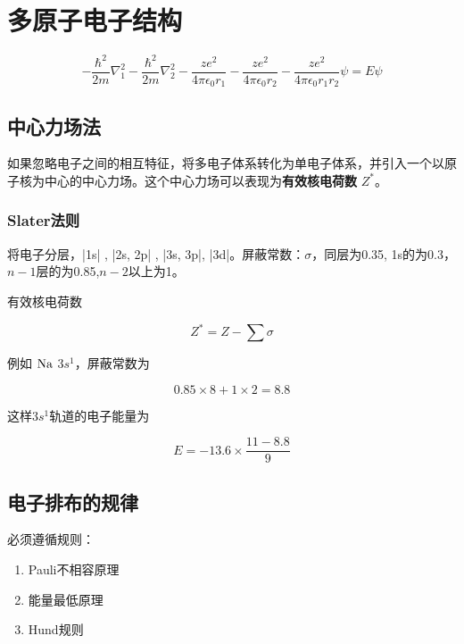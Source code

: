 \chapter{多原子电子结构}

\begin{equation*}
	-\frac{\hbar^2}{2m} \nabla_1^2 - \frac{\hbar^2}{2m} \nabla_2^2 - \frac{ze^2}{4\pi\epsilon_0r_1} - \frac{ze^2}{4\pi\epsilon_0r_2} - \frac{ze^2}{4\pi\epsilon_0r_1r_2} \psi = E\psi
\end{equation*}

\section{中心力场法}

如果忽略电子之间的相互特征，将多电子体系转化为单电子体系，并引入一个以原子核为中心的中心力场。这个中心力场可以表现为\textbf{有效核电荷数} $Z^*$。

\subsection{Slater法则}

将电子分层，|1s| , |2s, 2p| , |3s, 3p|, |3d|。屏蔽常数：$\sigma$，同层为0.35, 1s的为0.3，$n - 1$层的为0.85,$n - 2$以上为1。

有效核电荷数

\begin{equation*}
	Z^* = Z - \sum \sigma
\end{equation*}

例如 $\ce{Na}$ $3s^1$，屏蔽常数为

\begin{equation*}
	0.85 \times 8 + 1 \times 2 = 8.8
\end{equation*}

这样$3s^1$轨道的电子能量为

\begin{equation*}
	E = -13.6 \times \frac{11 - 8.8}{9}
\end{equation*}


\section{电子排布的规律}

必须遵循规则：

\begin{enumerate}
	\item Pauli不相容原理
	\item 能量最低原理
	\item Hund规则
\end{enumerate}

